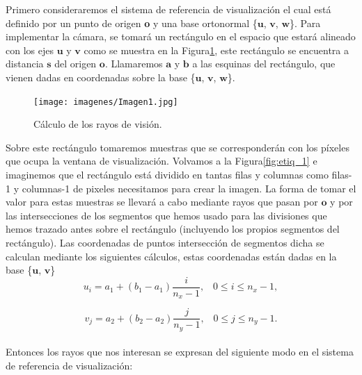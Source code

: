 Primero consideraremos el sistema de referencia de visualización el cual está definido por un punto de origen \textbf{o} y una base ortonormal \{$\textbf{u}$, $\textbf{v}$, $\textbf{w}$\}. Para implementar la cámara, se tomará un rectángulo en el espacio que estará alineado con los ejes $\textbf{u}$ y $\textbf{v}$ como se muestra en la Figura\ref{fig:etiq_3}, este rectángulo se encuentra a distancia $\textbf{s}$ del origen $\textbf{o}$. Llamaremos $\textbf{a}$ y $\textbf{b}$ a las esquinas del rectángulo, que vienen dadas en coordenadas sobre la base \{$\textbf{u}$, $\textbf{v}$, $\textbf{w}$\}.
	${ }$\\

\begin{figure}[h]
	\begin{center}
		\texttt{[image: imagenes/Imagen1.jpg]}
	\end{center}
	\caption{Cálculo de los rayos de visión.}
	\label{fig:etiq_3}
\end{figure}




Sobre este rectángulo tomaremos muestras que se corresponderán con los píxeles que ocupa la ventana de visualización. Volvamos a la Figura\ref{fig:etiq_1} e imaginemos que el rectángulo está dividido en tantas filas y columnas como filas-1 y columnas-1 de pixeles necesitamos para crear la imagen. La forma de tomar el valor para estas muestras se llevará a cabo mediante rayos que pasan por $\textbf{o}$ y por las intersecciones de los segmentos que hemos usado para las divisiones que hemos trazado antes sobre el rectángulo (incluyendo los propios segmentos del rectángulo). Las coordenadas de puntos intersección de segmentos dicha se calculan mediante los siguientes cálculos, estas coordenadas están dadas en la base \{$\textbf{u}$, $\textbf{v}$\}
${ }$\\


\[
	u_i = a_1 + (b_1-a_1) \frac{i}{n_x-1}, \;\;\; 0 \leq i \leq n_x -1,
\]

\[
	v_j = a_2 + (b_2-a_2) \frac{j}{n_y-1}, \;\;\; 0 \leq j \leq n_y -1.
\]
${ }$\\

Entonces los rayos que nos interesan se expresan del siguiente modo en el sistema de referencia de visualización:
${ }$\\

